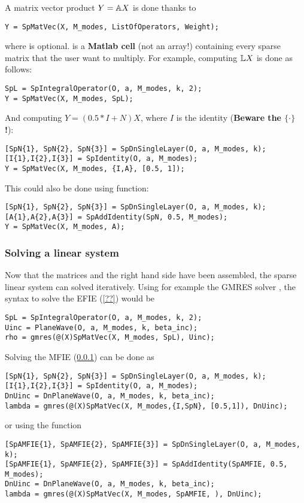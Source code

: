 A matrix vector product $Y = {\mathbb{A}} X$ is done thanks to 
\begin{verbatim}
Y = SpMatVec(X, M_modes, ListOfOperators, Weight);
\end{verbatim}
where  is optional.  is a \textbf{Matlab cell} (not an array!) containing every sparse matrix that the user want to multiply. For example, computing ${\mathbb{L}} X$ is done as follows:
\begin{verbatim}
SpL = SpIntegralOperator(O, a, M_modes, k, 2);
Y = SpMatVec(X, M_modes, SpL);
\end{verbatim}
And computing $Y =(0.5*I + N)X$, where $I$ is the identity (\textbf{Beware the $\{\cdot\}$ !}):
\begin{verbatim}
[SpN{1}, SpN{2}, SpN{3}] = SpDnSingleLayer(O, a, M_modes, k);
[I{1},I{2},I{3}] = SpIdentity(O, a, M_modes);
Y = SpMatVec(X, M_modes, {I,A}, [0.5, 1]);
\end{verbatim}
This could also be done using  function:
\begin{verbatim}
[SpN{1}, SpN{2}, SpN{3}] = SpDnSingleLayer(O, a, M_modes, k);
[A{1},A{2},A{3}] = SpAddIdentity(SpN, 0.5, M_modes);
Y = SpMatVec(X, M_modes, A);
\end{verbatim}

\subsubsection{Solving a linear system}

Now that the matrices and the right hand side have been assembled, the sparse linear system can solved iteratively. Using for example the GMRES solver \cite{??}, the syntax to solve the EFIE (\ref{??}) would be
\begin{verbatim}
SpL = SpIntegralOperator(O, a, M_modes, k, 2);
Uinc = PlaneWave(O, a, M_modes, k, beta_inc);
rho = gmres(@(X)SpMatVec(X, M_modes, SpL), Uinc);
\end{verbatim}
Solving the MFIE (\ref{}) can be done as
\begin{verbatim}
[SpN{1}, SpN{2}, SpN{3}] = SpDnSingleLayer(O, a, M_modes, k);
[I{1},I{2},I{3}] = SpIdentity(O, a, M_modes);
DnUinc = DnPlaneWave(O, a, M_modes, k, beta_inc);
lambda = gmres(@(X)SpMatVec(X, M_modes,{I,SpN}, [0.5,1]), DnUinc);
\end{verbatim}
or using the  function
\begin{verbatim}
[SpAMFIE{1}, SpAMFIE{2}, SpAMFIE{3}] = SpDnSingleLayer(O, a, M_modes, k);
[SpAMFIE{1}, SpAMFIE{2}, SpAMFIE{3}] = SpAddIdentity(SpAMFIE, 0.5, M_modes);
DnUinc = DnPlaneWave(O, a, M_modes, k, beta_inc);
lambda = gmres(@(X)SpMatVec(X, M_modes, SpAMFIE, ), DnUinc);
\end{verbatim}


